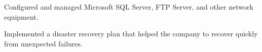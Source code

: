 \begin{cventries}
{\begin{cvitems}
        \item {Configured and managed Microsoft SQL Server, FTP Server, and other network equipment.}
        \item {Implemented a disaster recovery plan that helped the company to recover quickly from unexpected failures.}
      \end{cvitems}%
    }%
\end{cventries}
